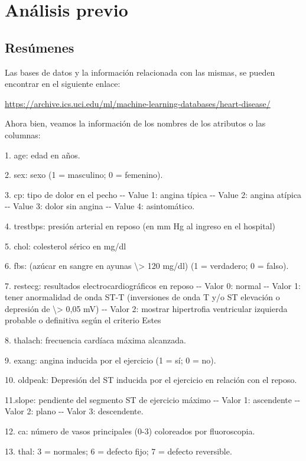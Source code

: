 \documentclass[
]{article}
\begin{document}
\hypertarget{anuxe1lisis-previo}{%
\section{Análisis previo}\label{anuxe1lisis-previo}}

\hypertarget{resuxfamenes}{%
\subsection{Resúmenes}\label{resuxfamenes}}

Las bases de datos y la información relacionada con las mismas, se
pueden encontrar en el siguiente enlace:

\url{https://archive.ics.uci.edu/ml/machine-learning-databases/heart-disease/}

Ahora bien, veamos la información de los nombres de los atributos o las
columnas:

1. age: edad en años.

2. sex: sexo (1 = masculino; 0 = femenino).

3. cp: tipo de dolor en el pecho -\/- Value 1: angina típica -\/- Value
2: angina atípica -\/- Value 3: dolor sin angina -\/- Value 4:
asintomático.

4. trestbps: presión arterial en reposo (en mm Hg al ingreso en el
hospital)

5. chol: colesterol sérico en mg/dl

6. fbs: (azúcar en sangre en ayunas \textbackslash\textgreater{} 120
mg/dl) (1 = verdadero; 0 = falso).

7. restecg: resultados electrocardiográficos en reposo -\/- Valor 0:
normal -\/- Valor 1: tener anormalidad de onda ST-T (inversiones de onda
T y/o ST elevación o depresión de \textbackslash\textgreater{} 0,05 mV)
-\/- Valor 2: mostrar hipertrofia ventricular izquierda probable o
definitiva según el criterio Estes

8. thalach: frecuencia cardíaca máxima alcanzada.

9. exang: angina inducida por el ejercicio (1 = sí; 0 = no).

10. oldpeak: Depresión del ST inducida por el ejercicio en relación con
el reposo.

11.slope: pendiente del segmento ST de ejercicio máximo -\/- Valor 1:
ascendente -\/- Valor 2: plano -\/- Valor 3: descendente.

12. ca: número de vasos principales (0-3) coloreados por fluoroscopia.

13. thal: 3 = normales; 6 = defecto fijo; 7 = defecto reversible.
\end{document}
